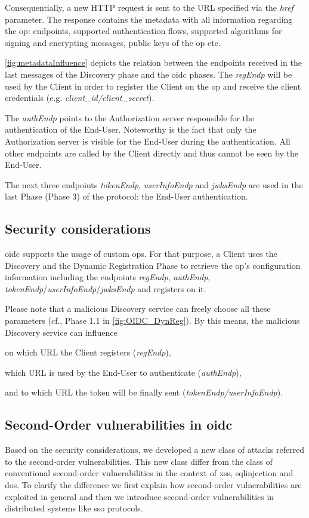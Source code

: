 \documentclass[conference,compsoc]{IEEEtran}
\begin{document}
Consequentially, a new HTTP request is sent to the URL specified via the \emph{href} parameter. The response contains the metadata with all information regarding the \gls{op}: endpoints, supported authentication flows, supported algorithms for signing and encrypting messages, public keys of the \gls{op} etc.

\autoref{fig:metadataInfluence} depicts the relation between the endpoints received in the last messages of the Discovery phase and the \gls{oidc} phases.
The \emph{regEndp} will be used by the Client in order to register the Client on the \gls{op} and receive the client credentials (e.g. \emph{client\_id/client\_secret}).

The \emph{authEndp} points to the Authorization server responsible for the authentication of the End-User. Noteworthy is the fact that only the Authorization server is visible for the End-User during the authentication. All other endpoints are called by the Client directly and thus cannot be seen by the End-User.

The next three endpoints \emph{tokenEndp}, \emph{userInfoEndp} and \emph{jwksEndp} are used in the last Phase (Phase 3) of the protocol: the End-User authentication. 

\subsection{Security considerations}

\gls{oidc} supports the usage of custom \glspl{op}.
For that purpose, a Client uses the Discovery and the Dynamic Registration Phase to retrieve the \gls{op}'s configuration information including the endpoints \emph{regEndp}, \emph{authEndp}, \emph{tokenEndp}/\emph{userInfoEndp}/\emph{jwksEndp} and registers on it. 

Please note that a malicious Discovery service can freely choose all these parameters (cf., Phase 1.1 in \autoref{fig:OIDC_DynReg}).
By this means, the malicious Discovery service can influence 
\begin{inparaenum}
	\item on which URL the Client registers (\emph{regEndp}),
	\item which URL is used by the End-User to authenticate (\emph{authEndp}),
	\item and to which URL the token will be finally sent (\emph{tokenEndp/userInfoEndp}).
\end{inparaenum}


\subsection{Second-Order vulnerabilities in \gls{oidc}}
Based on the security considerations, we developed a new class of attacks referred to the second-order vulnerabilities. 
This new class differ from the class of conventional second-order vulnerabilities in the context of \gls{xss}, \gls{sqlinjection} and \gls{dos}.
To clarify the difference we first explain how second-order vulnerabilities are exploited in general and then we introduce second-order vulnerabilities in distributed systems like \gls{sso} protocols.
\end{document}
